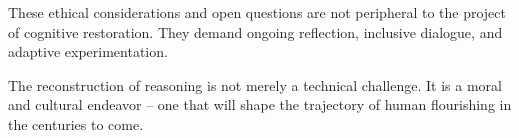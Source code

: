 These ethical considerations and open questions are not peripheral to
the project of cognitive restoration. They demand ongoing reflection, 
inclusive dialogue, and adaptive experimentation.

The reconstruction of reasoning is not merely a technical challenge. It
is a moral and cultural endeavor -- one that will shape the trajectory of
human flourishing in the centuries to come.

